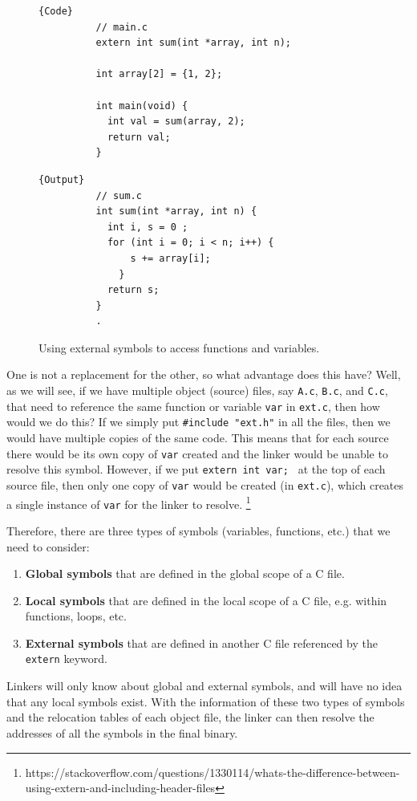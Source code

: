 \documentclass{article}
\begin{document}
      \begin{figure}[H]
        \centering 
        \noindent\begin{minipage}{.50\textwidth}
        \begin{lstlisting}[]{Code}
          // main.c
          extern int sum(int *array, int n); 

          int array[2] = {1, 2};

          int main(void) {
            int val = sum(array, 2); 
            return val; 
          }
        \end{lstlisting}
        \end{minipage}
        \hfill
        \begin{minipage}{.49\textwidth}
        \begin{lstlisting}[]{Output}
          // sum.c
          int sum(int *array, int n) {
            int i, s = 0 ; 
            for (int i = 0; i < n; i++) {
                s += array[i];
              }
            return s;
          }
          .
        \end{lstlisting}
        \end{minipage}
        \caption{Using external symbols to access functions and variables.} 
        \label{fig:external_symbols_example}
      \end{figure}
      
      One is not a replacement for the other, so what advantage does this have? Well, as we will see, if we have multiple object (source) files, say \texttt{A.c}, \texttt{B.c}, and \texttt{C.c}, that need to reference the same function or variable \texttt{var} in \texttt{ext.c}, then how would we do this? If we simply put \texttt{\#include "ext.h"} in all the files, then we would have multiple copies of the same code. This means that for each source there would be its own copy of \texttt{var} created and the linker would be unable to resolve this symbol. However, if we put \texttt{extern int var; } at the top of each source file, then only one copy of \texttt{var} would be created (in \texttt{ext.c}), which creates a single instance of \texttt{var} for the linker to resolve. \footnote{https://stackoverflow.com/questions/1330114/whats-the-difference-between-using-extern-and-including-header-files}

      Therefore, there are three types of symbols (variables, functions, etc.) that we need to consider: 
      \begin{enumerate}
        \item \textbf{Global symbols} that are defined in the global scope of a C file. 
        \item \textbf{Local symbols} that are defined in the local scope of a C file, e.g. within functions, loops, etc. 
        \item \textbf{External symbols} that are defined in another C file referenced by the \texttt{extern} keyword.
      \end{enumerate}
      Linkers will only know about global and external symbols, and will have no idea that any local symbols exist. With the information of these two types of symbols and the relocation tables of each object file, the linker can then resolve the addresses of all the symbols in the final binary. 
\end{document}
